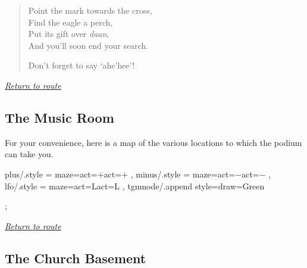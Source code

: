 \documentclass[a5paper]{extarticle}
\begin{document}
\begin{quote}
Point the mark towards the cross,\\
Find the eagle a perch,\\
Put its gift over \emph{daan},\\
And you'll soon end your search.\par
Don't forget to say ‘ahe'hee’!
\end{quote}

\hyperref[sec:route-5]{\emph{Return to route}}

\newpage
\subsection{The Music Room}\label{sec:nb-Music-Room}

For your convenience, here is a map of the various locations to which the
podium can take you.

\medskip
\bgroup\tikzset
{ plus/.style  = {maze={act={$+$}}{act={$+$}}}
, minus/.style = {maze={act={$-$}}{act={$-$}}}
, lfo/.style   = {maze={act={L}}{act={L}}}
, tgmnode/.append style={draw=Green}
}
\begin{adjustbox}{valign=t,center}
\sffamily
\begin{gamemap}
;
\end{gamemap}
\end{adjustbox}

\bigskip
\hyperref[sec:route-6]{\emph{Return to route}}

\newpage
\subsection{The Church Basement}\label{sec:nb-Church-Basement}
\end{document}
